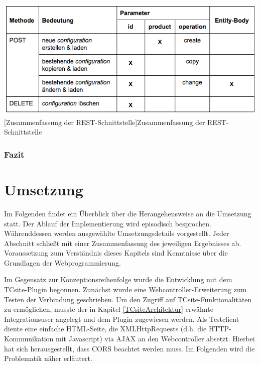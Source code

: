 \documentclass[11pt, a4paper, titlepage, listof=totoc, bibliography=totoc, index=totoc, twoside, openright, headings=normal]{scrreprt}
\begin{document}
\vspace{1em}
\begin{minipage}{\linewidth}
	\centering
	\includegraphics[width=1\linewidth]{Abbildungen/konzeptRestZusammenfassung.png}
	[Zusammenfassung der REST-Schnittstelle]{Zusammenfassung der REST-Schnittstelle}
	\label{tab:konzeptRestZusammenfassung}
\end{minipage}
\vspace{1em}

\subsection*{Fazit}

\chapter{Umsetzung}
\label{Umsetzung}
Im Folgenden findet ein Überblick über die Herangehensweise an die Umsetzung statt. Der Ablauf der Implementierung wird episodisch besprochen. Währenddessen werden ausgewählte Umsetzungsdetails vorgestellt. Jeder Abschnitt schließt mit einer Zusammenfassung des jeweiligen Ergebnisses ab. Voraussetzung zum Verständnis dieses Kapitels sind Kenntnisse über die Grundlagen der Webprogrammierung.

Im Gegensatz zur Konzeptionsreihenfolge wurde die Entwicklung mit dem TCsite-Plugin begonnen. Zunächst wurde eine Webcontroller-Erweiterung zum Testen der Verbindung geschrieben. Um den Zugriff auf TCsite-Funktionalitäten zu ermöglichen, musste der in Kapitel \ref{TCsiteArchitektur} erwähnte Integrationsuser angelegt und dem Plugin zugewiesen werden. Als Testclient diente eine einfache HTML-Seite, die XMLHttpRequests (d.h. die HTTP-Kommunikation mit Javascript) via \ac{AJAX} an den Webcontroller absetzt. Hierbei hat sich herausgestellt, dass  \ac{CORS} beachtet werden muss. Im Folgenden wird die Problematik näher erläutert.
\end{document}
